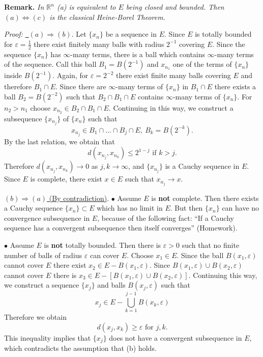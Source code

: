 \documentclass[12pt]{report}
\begin{document}
\bigskip
\noindent
\textbf{Remark.} \textit{ In $\mathbb{R}^n$ (a) is equivalent to $E$
being closed and bounded.  Then $(a) \Longleftrightarrow (c)$ is the
classical Heine-Borel Theorem.}

\medskip
\noindent
\textit{Proof:} \underline{\ $(a) \Longrightarrow (b)$}. 
 Let $\{x_n\}$ be a sequence in
$E$.  Since $E$ is totally  bounded for $\varepsilon = \frac{1}{2}$
there exist finitely many balls with radius $2^{-1}$ covering $E$. 
Since the sequence $\{x_n\}$ has
$\infty$-many terms, there is a ball which contains $\infty$-many
terms of the sequence.  Call  this ball $B_1 = B(2^{-1})$ and $x_{n_1}$
one of the terms of
$\{x_n\}$ inside $B(2^{-1})$.  Again, for $\varepsilon = 2^{-2}$ there
exist finite many balls  covering $E$ and therefore $B_1 \cap E$. 
Since there are $\infty$-many terms of $\{x_n\}$ in $B_1
\cap E$ there exists a ball $B_2 = B(2^{-2})$ such that $B_2 \cap B_1
\cap E$ contains
$\infty$-many terms of $\{x_n\}$.  For $n_2 > n_1$ choose $x_{n_2}
\in B_2 \cap B_1
\cap E$.  Continuing in this way, we construct a subsequence
$\{x_{n_j}\}$ of
$\{x_n\}$ such that
\[ x_{n_j} \in B_1 \cap \dots \cap B_j \cap E, \  B_k = B(2^{-k}).
\] 
By the last relation, we obtain that
\[ d(x_{n_j}, x_{n_k}) \le 2^{1-j} \mbox{ if } k > j.
\] 
Therefore $d(x_{n_j}, x_{n_k}) \longrightarrow 0$ as $j, k \to
\infty$, and
$\{x_{n_j}\}$ is a Cauchy sequence in $E$.  Since $E$ is complete, there
exist $x \in E$ such that
$x_{n_j} \longrightarrow x$.

\medskip
\noindent
\underline{$(b) \Longrightarrow  (a)$ (By contradiction)}.
$\bullet$  Assume $E$ is \textbf{not} complete.  Then there exists a
Cauchy sequence $\{x_n\} \subset E$ which has no limit in $E$.  But
then $\{x_n\}$ can have no convergence subsequence in $E$, because
of the following fact: ``If a Cauchy sequence has a convergent
subsequence then itself converges'' (Homework).

\medskip
\noindent
$\bullet$  Assume $E$ is \textbf{not} totally bounded.  Then there is
$\varepsilon > 0 
$ such that no finite number of balls of radius $\varepsilon$ can
cover $E$.  Choose
$x_1 \in E$.  Since the ball $B(x_1, \varepsilon)$ cannot  cover $E$
there exist $x_2
\in E - B(x_1, \varepsilon)$.  Since $B(x_1, \varepsilon) \cup B(x_2,
\varepsilon)$ cannot cover $E$  there is $x_3 \in E - [B(x_1,
\varepsilon) \cup B(x_2,
\varepsilon)]$.  Continuing this way, we construct a sequence
$\{x_j\}$ and balls $ B(x_j, \varepsilon)$ such that
\[ x_j \in E - \bigcup^{j-1}_{k=1} B(x_k, \varepsilon)
\] Therefore we obtain
\[ d(x_j, x_k) \ge \varepsilon \mbox{ for } j, k.
\] This inequality implies that $\{x_j\}$ does not have a convergent
subsequence  in
$E$, which contradicts the assumption that (b) holds.
\end{document}
